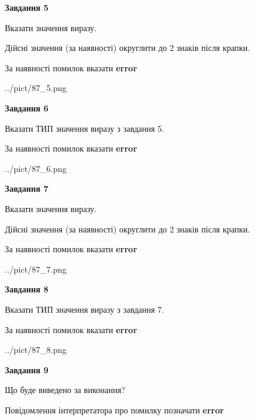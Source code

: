 \documentclass[11pt, ukrainian]{article}
\begin{document}
{\begin {large}
{\begin {center}\textbf{Завдання 5}\end {center}}\par
Вказати значення виразу. \par
Дійсні значення (за наявності) округлити до 2 знаків після крапки. \par
За наявності помилок вказати \textbf{error}

\begin{center}
	{../pict/87_5.png}
\end{center}
\newpage

{\begin {center}\textbf{Завдання 6}\end {center}}\par
Вказати ТИП значення виразу з завдання 5. \par
За наявності помилок вказати \textbf{error}

\begin{center}
	{../pict/87_6.png}
\end{center}
\newpage

{\begin {center}\textbf{Завдання 7}\end {center}}\par
Вказати значення виразу. \par
Дійсні значення (за наявності) округлити до 2 знаків після крапки. \par
За наявності помилок вказати \textbf{error}

\begin{center}
	{../pict/87_7.png}
\end{center}
\newpage

{\begin {center}\textbf{Завдання 8}\end {center}}\par
Вказати ТИП значення виразу з завдання 7. \par
За наявності помилок вказати \textbf{error}

\begin{center}
	{../pict/87_8.png}
\end{center}
\newpage

{\begin {center}\textbf{Завдання 9}\end {center}}\par
Що буде виведено за виконання? \par
Повідомлення інтерпретатора про помилку позначати \textbf{error}


\end{large}}
\end{document}
